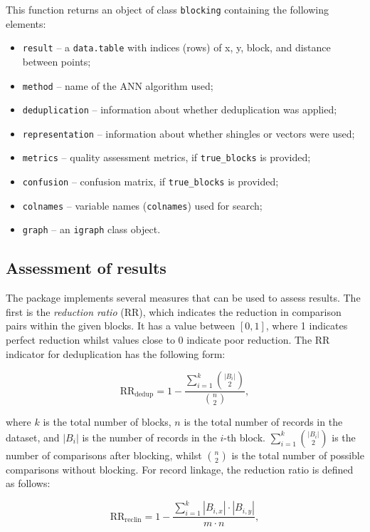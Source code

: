 This function returns an object of class \texttt{blocking} containing the
following elements:

\begin{itemize}
\tightlist
\item
  \texttt{result} -- a \texttt{data.table} with indices (rows) of x, y, block, and
  distance between points;
\item
  \texttt{method} -- name of the ANN algorithm used;
\item
  \texttt{deduplication} -- information about whether deduplication was
  applied;
\item
  \texttt{representation} -- information about whether shingles or vectors
  were used;
\item
  \texttt{metrics} -- quality assessment metrics, if \texttt{true\_blocks} is
  provided;
\item
  \texttt{confusion} -- confusion matrix, if \texttt{true\_blocks} is provided;
\item
  \texttt{colnames} -- variable names (\texttt{colnames}) used for search;
\item
  \texttt{graph} -- an \texttt{igraph} class object.
\end{itemize}

\subsection{Assessment of results}\label{sec-assess}

The package implements several measures that can be used to assess
results. The first is the \emph{reduction ratio} (RR), which indicates the
reduction in comparison pairs within the given blocks. It has a value
between \([0,1]\), where 1 indicates perfect reduction whilst values close
to 0 indicate poor reduction. The RR indicator for deduplication has the
following form:

\[
\text{RR}_{\text{dedup}} = 1 - \frac{\sum\limits_{i=1}^{k} \binom{|B_i|}{2}}{\binom{n}{2}},
\]

\noindent where \(k\) is the total number of blocks, \(n\) is the total
number of records in the dataset, and \(|B_i|\) is the number of records
in the \(i\)-th block. \(\sum\limits_{i=1}^{k} \binom{|B_i|}{2}\) is the
number of comparisons after blocking, whilst \(\binom{n}{2}\) is the total
number of possible comparisons without blocking. For record linkage, the
reduction ratio is defined as follows:

\[
\text{RR}_{\text{reclin}} = 1 - \frac{\sum\limits_{i=1}^{k} |B_{i,x}| \cdot |B_{i,y}|} {m \cdot n},
\]

